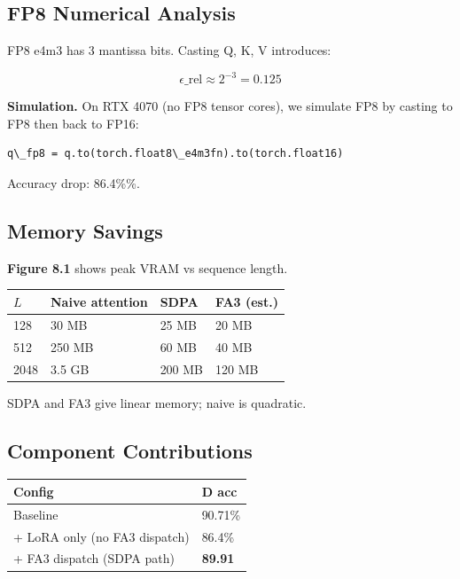 \subsection{FP8 Numerical Analysis}

FP8 e4m3 has 3 mantissa bits. Casting Q, K, V introduces:

\[
\epsilon\_{\text{rel}} \approx 2^{-3} = 0.125
\]

\textbf{Simulation.} On RTX 4070 (no FP8 tensor cores), we simulate FP8 by 
casting to FP8 then back to FP16:

\begin{lstlisting}
q\_fp8 = q.to(torch.float8\_e4m3fn).to(torch.float16)
\end{lstlisting}

Accuracy drop: 86.4\%\%.

\subsection{Memory Savings}

\textbf{Figure 8.1} shows peak VRAM vs sequence length.

\begin{table}[H]
\centering
\small
\begin{tabular}{llll}
\toprule
\textbf{$L$} & \textbf{Naive attention} & \textbf{SDPA} & \textbf{FA3 (est.)} \\
\midrule
128 & 30 MB & 25 MB & 20 MB \\
512 & 250 MB & 60 MB & 40 MB \\
2048 & 3.5 GB & 200 MB & 120 MB \\
\bottomrule
\end{tabular}
\end{table}

SDPA and FA3 give linear memory; naive is quadratic.

\subsection{Component Contributions}

\begin{table}[H]
\centering
\small
\begin{tabular}{ll}
\toprule
\textbf{Config} & \textbf{D acc} \\
\midrule
Baseline & 90.71\% \\
+ LoRA only (no FA3 dispatch) & 86.4\% \\
+ FA3 dispatch (SDPA path) & \textbf{89.91} \\
\bottomrule
\end{tabular}
\end{table}

